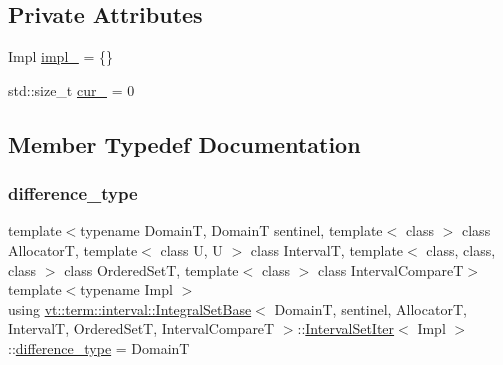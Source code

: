 \subsection*{Private Attributes}
\begin{DoxyCompactItemize}
\item 
Impl \hyperlink{structvt_1_1term_1_1interval_1_1_integral_set_base_1_1_interval_set_iter_a4180d4e5b3e4dcfef87b99d2e2ca760c}{impl\+\_\+} = \{\}
\item 
std\+::size\+\_\+t \hyperlink{structvt_1_1term_1_1interval_1_1_integral_set_base_1_1_interval_set_iter_a39af9348b844da48482e8d719b9d4c14}{cur\+\_\+} = 0
\end{DoxyCompactItemize}


\subsection{Member Typedef Documentation}
\mbox{\label{structvt_1_1term_1_1interval_1_1_integral_set_base_1_1_interval_set_iter_aba8b3805fbc28a4fbb78cad61e0f2ed4}} 
\subsubsection{\texorpdfstring{difference\+\_\+type}{difference\_type}}
{\footnotesize\ttfamily template$<$typename DomainT, DomainT sentinel, template$<$ class $>$ class AllocatorT, template$<$ class U, U $>$ class IntervalT, template$<$ class, class, class $>$ class Ordered\+SetT, template$<$ class $>$ class Interval\+CompareT$>$ \\
template$<$typename Impl $>$ \\
using \hyperlink{structvt_1_1term_1_1interval_1_1_integral_set_base}{vt\+::term\+::interval\+::\+Integral\+Set\+Base}$<$ DomainT, sentinel, AllocatorT, IntervalT, Ordered\+SetT, Interval\+CompareT $>$\+::\hyperlink{structvt_1_1term_1_1interval_1_1_integral_set_base_1_1_interval_set_iter}{Interval\+Set\+Iter}$<$ Impl $>$\+::\hyperlink{structvt_1_1term_1_1interval_1_1_integral_set_base_1_1_interval_set_iter_aba8b3805fbc28a4fbb78cad61e0f2ed4}{difference\+\_\+type} =  DomainT}

